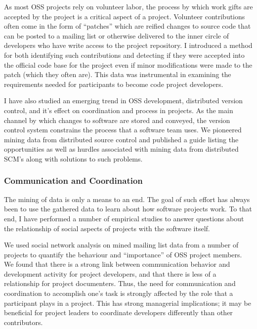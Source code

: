 \documentclass[10pt]{article}
\newcommand\Subsection[1]{\subsubsection*{#1}}
\begin{document}
\begin{small}
As most OSS projects rely on volunteer labor, the process by which work gifts
are accepted by the project is a critical aspect of a project.  Volunteer
contributions often come in the form of ``patches'' which are reified changes
to source code that can be posted to a mailing list or otherwise delivered to
the inner circle of developers who have write access to the project repository.  I
introduced a method for both identifying such contributions and
detecting if they were accepted into the official code base for the project
even if minor modifications were made to the patch (which they often are).  This
data was instrumental in examining the requirements needed for participants
to become code project developers.

I have also studied an emerging trend in OSS development, distributed version
control, and it's effect on coordination and process in projects.  As the main
channel by which changes to software are stored and conveyed, the version
control system constrains the process that a software team uses.  We pioneered
mining data from distributed source control and published a guide listing the
opportunities as well as hurdles associated with mining data from distributed
SCM's along with solutions to such problems.


\Subsection{Communication and Coordination}

The mining of data is only a means to an end.  The goal of such
effort has always been to use the gathered data to learn about how software
projects work.  To that end, I have performed a number of empirical studies
to answer questions about the relationship of social aspects of projects
with the software itself.

We used social network analysis on mined mailing list data from a number of projects 
to quantify the behaviour and ``importance'' of OSS project members.
We found that there is a strong link between communication behavior and
development activity for project developers, and that there is less of a
relationship for project documenters.  Thus, the need for communication and
coordination to accomplish one's task is strongly affected by the role that a
participant plays in a project.  This has strong managerial implications; it may
be beneficial for project leaders to coordinate developers differently than
other contributors.


\end{small}
\end{document}
